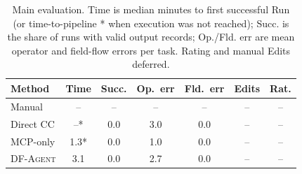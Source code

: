 \begin{table}[t]
\centering
\small
\setlength{\tabcolsep}{3pt}
\begin{tabular}{lcccccc}
\toprule
Method & Time & Succ. & Op.\ err & Fld.\ err & Edits & Rat. \\
\midrule
Manual & -- & -- & -- & -- & -- & -- \\
Direct CC & --* & 0.0 & 3.0 & 0.0 & -- & -- \\
MCP-only & 1.3* & 0.0 & 1.0 & 0.0 & -- & -- \\
\textsc{DF-Agent} & 3.1 & 0.0 & 2.7 & 0.0 & -- & -- \\
\bottomrule
\end{tabular}
\caption{Main evaluation. Time is median minutes to first successful Run (or time-to-pipeline * when execution was not reached); Succ. is the share of runs with valid output records; Op./Fld. err are mean operator and field-flow errors per task. Rating and manual Edits deferred.}
\label{tab:eval}
\end{table}
